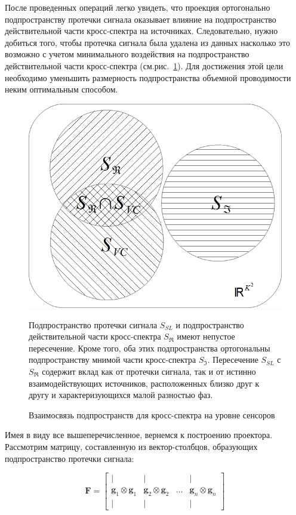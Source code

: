 После проведенных операций легко увидеть, что проекция ортогонально подпространству протечки сигнала
оказывает влияние на подпространство действительной части кросс-спектра на источниках.
Следовательно, нужно добиться того, чтобы протечка сигнала была удалена из данных
насколько это возможно с учетом минимального воздействия на подпространство
действительной части кросс-спектра (см.рис.~\ref{fig:subspaces}).
Для достижения этой цели необходимо уменьшить размерность подпространства
объемной проводимости неким оптимальным способом.

\begin{figure}[htbp]
\centering
\includegraphics[width=12cm]{./images/SetsReImVC.jpg}
\caption{Взаимосвязь подпространств для кросс-спектра на уровне сенсоров}
\medskip
\small
Подпространство протечки сигнала $S_{SL}$ и подпространство действительной части кросс-спектра $S_{\Re}$
имеют непустое пересечение. Кроме того, оба этих подпространства ортогональны подпространству мнимой
части кросс-спектра $S_{\Im}$.
Пересечение $S_{SL}$ с $S_{\Re}$ содержит вклад как от протечки сигнала,
так и от истинно взаимодействующих источников, расположенных близко друг к другу и характеризующихся малой разностью фаз.
\label{fig:subspaces}
\end{figure}%
Имея в виду все вышеперечисленное, вернемся к построению проектора.
Рассмотрим матрицу, составленную из вектор-столбцов, образующих подпространство протечки сигнала:

\begin{equation}
    \mathbf{F} =
    \begin{bmatrix}
        |                                 & |                                 &       & |                                 \\
        \mathbf{g}_1 \otimes \mathbf{g}_1 & \mathbf{g}_2 \otimes \mathbf{g}_2 & \dots & \mathbf{g}_n \otimes \mathbf{g}_n \\
        |                                 & |                                 &       & |
    \end{bmatrix}
\end{equation}

